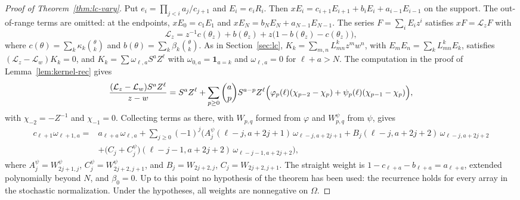 \documentclass[twoside,10pt]{article}
\numberwithin{equation}{section}
\theoremstyle{slbody}
\theoremstyle{definition}
\theoremstyle{remark}
\begin{document}
\begin{proof}[Proof of Theorem~\ref{thm:lc-vary}]
Put $e_i=\prod_{j<i}a_j/c_{j+1}$ and $E_i=e_iR_i$. Then $xE_i=c_{i+1}E_{i+1}+b_iE_i+a_{i-1}E_{i-1}$ on the support. The out-of-range terms are omitted: at the endpoints, $xE_0=c_1E_1$ and $xE_N=b_NE_N+a_{N-1}E_{N-1}$. The series $F=\sum_iE_iz^i$ satisfies $xF=\mathcal L_zF$ with
\[
\mathcal L_z=z^{-1}c(\theta_z)+b(\theta_z)+z\bigl(1-b(\theta_z)-c(\theta_z)\bigr),
\]
where $c(\theta)=\sum_k\kappa_k\binom\theta k$ and $b(\theta)=\sum_k\beta_k\binom\theta k$. As in Section~\ref{sec:lc}, $K_k=\sum_{m,n}L_{mn}^kz^mw^n$, with $E_mE_n=\sum_kL_{mn}^kE_k$, satisfies $(\mathcal L_z-\mathcal L_w)K_k=0$, and $K_k=\sum\omega_{\ell,a}S^aZ^\ell$ with $\omega_{0,a}=\mathbf1_{a=k}$ and $\omega_{\ell,a}=0$ for $\ell+a>N$. The computation in the proof of Lemma~\ref{lem:kernel-rec} gives
\[
\frac{(\mathcal L_z-\mathcal L_w)S^aZ^\ell}{z-w}=S^aZ^\ell+\sum_{p\geq0}\binom apS^{a-p}Z^\ell\Bigl(\varphi_p(\ell)(\chi_{p-2}-\chi_p)+\psi_p(\ell)(\chi_{p-1}-\chi_p)\Bigr),
\]
with $\chi_{-2}=-Z^{-1}$ and $\chi_{-1}=0$. Collecting terms as there, with $W_{p,q}$ formed from $\varphi$ and $W^\psi_{p,q}$ from $\psi$, gives
\[
\begin{aligned}
c_{\ell+1}\omega_{\ell+1,a}={}&a_{\ell+a}\,\omega_{\ell,a}+\sum_{j\geq0}(-1)^j\Big(A^\psi_j(\ell-j,a+2j+1)\,\omega_{\ell-j,a+2j+1}+B_j(\ell-j,a+2j+2)\,\omega_{\ell-j,a+2j+2}\\
&+\bigl(C_j+C^\psi_j\bigr)(\ell-j-1,a+2j+2)\,\omega_{\ell-j-1,a+2j+2}\Big),
\end{aligned}
\]
where $A^\psi_j=W^\psi_{2j+1,j}$, $C^\psi_j=W^\psi_{2j+2,j+1}$, and $B_j=W_{2j+2,j}$, $C_j=W_{2j+2,j+1}$. The straight weight is $1-c_{\ell+a}-b_{\ell+a}=a_{\ell+a}$, extended polynomially beyond $N$, and $\beta_0=0$. Up to this point no hypothesis of the theorem has been used: the recurrence holds for every array in the stochastic normalization. Under the hypotheses, all weights are nonnegative on $\Omega$.


\end{proof}
\end{document}
